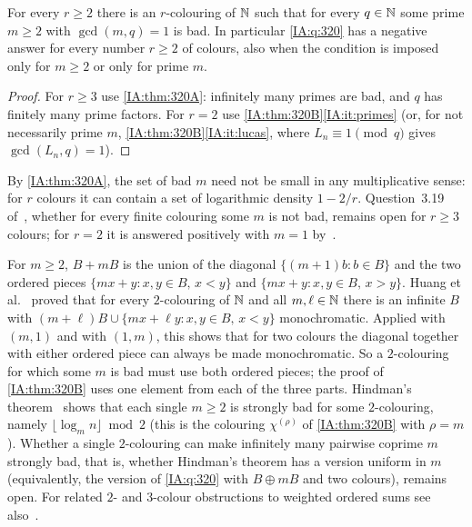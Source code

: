 \begin{corollary}\label{IA:cor:320}
For every $r\ge2$ there is an $r$-colouring of $\mathbb{N}$ such that for every $q\in\mathbb{N}$ some prime $m\ge2$
with $\gcd(m,q)=1$ is bad. In particular \cref{IA:q:320} has a negative answer for every number
$r\ge2$ of colours, also when the condition is imposed only for $m\ge2$ or only for prime $m$.
\end{corollary}

\begin{proof}
For $r\ge3$ use \cref{IA:thm:320A}: infinitely many primes are bad, and $q$ has finitely many prime
factors. For $r=2$ use \cref{IA:thm:320B}\ref{IA:it:primes} (or, for not necessarily prime $m$,
\cref{IA:thm:320B}\ref{IA:it:lucas}, where $L_n\equiv1\pmod q$ gives $\gcd(L_n,q)=1$).
\end{proof}

By \cref{IA:thm:320A}, the set of bad $m$ need not be small in any multiplicative sense: for $r$
colours it can contain a set of logarithmic density $1-2/r$. Question~3.19 of~\cite{kra2023problems}, whether
for every finite colouring some $m$ is not bad, remains open for $r\ge3$ colours; for $r=2$ it is
answered positively with $m=1$ by~\cite[Theorem~1.1]{huang2026affirmative}.

\begin{remark}\label{IA:rem:320diag}
For $m\ge2$, $B+mB$ is the union of the diagonal $\{(m+1)b:b\in B\}$ and the two ordered pieces
$\{mx+y:x,y\in B,\,x<y\}$ and $\{mx+y:x,y\in B,\,x>y\}$. Huang et
al.~\cite[Theorem~1.6]{huang2026affirmative} proved that for every $2$-colouring of $\mathbb{N}$ and all
$m,\ell\in\mathbb{N}$ there is an infinite $B$ with $(m+\ell)B\cup\{mx+\ell y:x,y\in B,\,x<y\}$ monochromatic.
Applied with $(m,1)$ and with $(1,m)$, this shows that for two colours the diagonal together with
either ordered piece can always be made monochromatic. So a $2$-colouring for which some $m$ is bad
must use both ordered pieces; the proof of \cref{IA:thm:320B} uses one element from each of the three
parts. Hindman's theorem~\cite[Theorem~2.11]{hindman1979partitions} shows that each single $m\ge2$
is strongly bad for some $2$-colouring, namely $\lfloor\log_mn\rfloor\bmod2$ (this is the colouring
$\chi^{(\rho)}$ of \cref{IA:thm:320B} with $\rho=m$). Whether a single $2$-colouring can make
infinitely many pairwise coprime $m$ strongly bad, that is, whether Hindman's theorem has a version
uniform in $m$ (equivalently, the version of \cref{IA:q:320} with $B\oplus mB$ and two colours),
remains open. For related $2$- and $3$-colour obstructions to weighted ordered sums see
also~\cite[Propositions~5.1 and~5.2]{huang2026affirmative}.
\end{remark}


